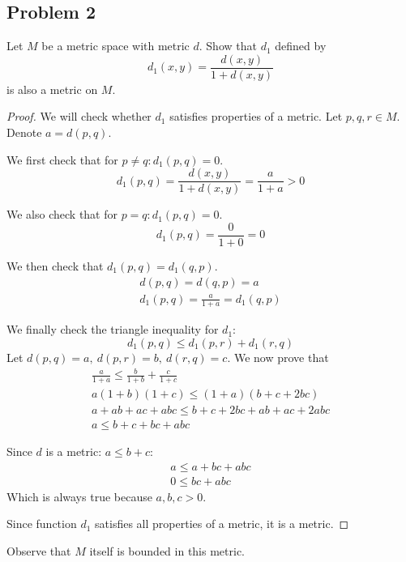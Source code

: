 \documentclass{article}
\begin{document}
\subsection*{Problem 2}

\begin{tcolorbox}
Let $M$ be a metric space with metric $d$. Show that $d_1$ defined by
\[ d_1 (x, y) = \frac{d(x, y)}{1 + d(x, y)} \]
is also a metric on $M$. 
\end{tcolorbox}

\begin{proof}
We will check whether $d_1$ satisfies properties of a metric. Let $p, q, r \in M$. Denote $a = d(p, q)$.

We first check that for $p \neq q : d_1(p, q) = 0 $.
\[ d_1(p, q) = \frac{d(x, y)}{1 + d(x, y)} = \frac{a}{1+a} > 0 \]

We also check that for $p = q : d_1(p, q) = 0$.
\[ d_1(p, q) = \frac{0}{1+0} = 0 \]

We then check that $d_1(p, q) = d_1(q, p)$.
\begin{gather*}
    d(p, q) = d(q, p) = a \\
    d_1(p, q) = \frac{a}{1+a} = d_1(q, p)    
\end{gather*}

We finally check the triangle inequality for $d_1$:
\[ d_1(p, q) \leq d_1(p, r) + d_1(r, q) \]
Let $d(p, q) = a, \> d(p, r) = b, \> d(r, q) = c$.
We now prove that
\begin{gather*}
    \frac{a}{1+a} \leq \frac{b}{1+b} + \frac{c}{1+c} \\
    a(1+b)(1+c) \leq (1+a)(b+c+2bc) \\
    a+ab+ac+abc \leq b+c+2bc+ab+ac+2abc \\
    a \leq b+c+bc+abc
\end{gather*}

Since $d$ is a metric: $a \leq b+c$:
\begin{gather*}
    a \leq a+bc+abc \\
    0 \leq bc+abc    
\end{gather*}
Which is always true because $a,b,c > 0$.

Since function $d_1$ satisfies all properties of a metric, it is a metric.

\end{proof}

\begin{tcolorbox}
Observe that $M$ itself is bounded in this metric.
\end{tcolorbox}
\end{document}
